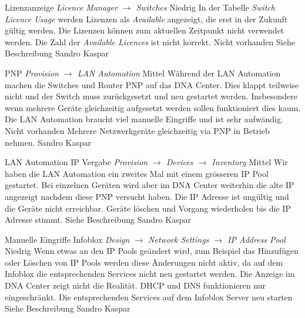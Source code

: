 \bugreport
{Lizenzanzeige}
{\textit{Licence Manager $\rightarrow$ Switches}}
{Niedrig}
{In der Tabelle \textit{Switch Licence Usage} werden Lizenzen als \textit{Available} angezeigt, die erst in der Zukunft gültig werden.}
{Die Lizenzen können zum aktuellen Zeitpunkt nicht verwendet werden. Die Zahl der \textit{Available Licences} ist nicht korrekt.}
{Nicht vorhanden}
{
	Siehe Beschreibung
}
{Sandro Kaspar}
{}


\bugreport
{PNP}
{\textit{Provision $\rightarrow$ LAN Automation}}
{Mittel}
{Während der LAN Automation machen die Switches und Router PNP auf das DNA Center. Dies klappt teilweise nicht und der Switch muss zurückgesetzt und neu gestartet werden. Insbesondere wenn mehrere Geräte gleichzeitig aufgesetzt werden sollen funktioniert dies kaum.}
{Die LAN Automation braucht viel manuelle Eingriffe und ist sehr aufwändig.}
{Nicht vorhanden}
{Mehrere Netzwerkgeräte gleichzeitig via PNP in Betrieb nehmen.}
{Sandro Kaspar}
{}


\bugreport
{LAN Automation IP Vergabe}
{\textit{Provision $\rightarrow$ Devices $\rightarrow$ Inventory}}
{Mittel}
{Wir haben die LAN Automation ein zweites Mal mit einem grösseren IP Pool gestartet. Bei einzelnen Geräten wird aber im DNA Center weiterhin die alte IP angezeigt nachdem diese PNP versucht haben.}
{Die IP Adresse ist ungültig und die Geräte nicht erreichbar.}
{Geräte löschen und Vorgang wiederholen bis die IP Adresse stimmt.}
{
	Siehe Beschreibung
}
{Sandro Kaspar}
{}

\bugreport
{Manuelle Eingriffe Infoblox}
{\textit{Design $\rightarrow$ Network Settings $\rightarrow$ IP Address Pool}}
{Niedrig}
{Wenn etwas an den IP Pools geändert wird, zum Beispiel das Hinzufügen oder Löschen von IP Pools werden diese Änderungen nicht aktiv, da auf dem Infoblox die entsprechenden Services nicht neu gestartet werden.}
{Die Anzeige im DNA Center zeigt nicht die Realität. DHCP und DNS funktionieren nur eingeschränkt.}
{Die entsprechenden Services auf dem Infoblox Server neu starten}
{
	Siehe Beschreibung
}
{Sandro Kaspar}
{}

